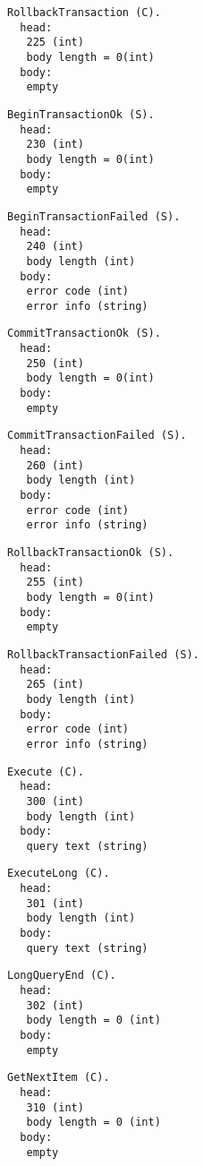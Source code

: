 \documentclass[a4paper,12pt]{article}
\begin{document}
\begin{verbatim}
RollbackTransaction (C).
  head:
   225 (int)
   body length = 0(int)
  body:
   empty
\end{verbatim}   

\begin{verbatim}
BeginTransactionOk (S).
  head:
   230 (int)
   body length = 0(int)
  body:
   empty
\end{verbatim}
   
\begin{verbatim}
BeginTransactionFailed (S).
  head:
   240 (int)
   body length (int)
  body:
   error code (int)
   error info (string)
\end{verbatim}

\begin{verbatim}
CommitTransactionOk (S).
  head:
   250 (int)
   body length = 0(int)
  body:
   empty
\end{verbatim}

\begin{verbatim}
CommitTransactionFailed (S).
  head:
   260 (int)
   body length (int)
  body:
   error code (int)
   error info (string)
\end{verbatim}

\begin{verbatim}
RollbackTransactionOk (S).
  head:
   255 (int)
   body length = 0(int)
  body:
   empty
\end{verbatim}

\begin{verbatim}
RollbackTransactionFailed (S).
  head:
   265 (int)
   body length (int)
  body:
   error code (int)
   error info (string)
\end{verbatim}

\begin{verbatim}
Execute (C).
  head:
   300 (int)
   body length (int)
  body:
   query text (string)
\end{verbatim}

\begin{verbatim}
ExecuteLong (C).
  head:
   301 (int)
   body length (int)
  body:
   query text (string)
\end{verbatim}

\begin{verbatim}
LongQueryEnd (C).
  head:
   302 (int)
   body length = 0 (int)
  body:
   empty
\end{verbatim}

\begin{verbatim}
GetNextItem (C).
  head:
   310 (int)
   body length = 0 (int)
  body:
   empty
\end{verbatim}
\end{document}
